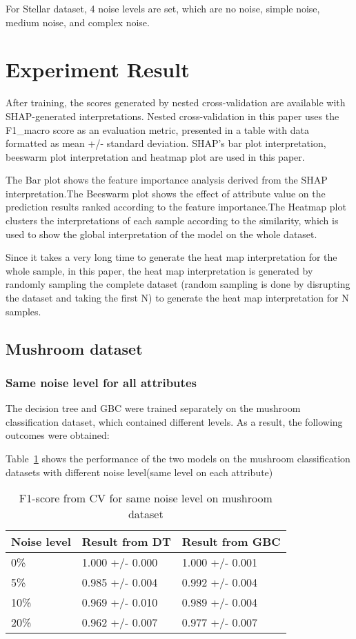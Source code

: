 \documentclass[runningheads,a4paper]{llncs}
\begin{document}
For Stellar dataset, 4 noise levels are set, which are no noise, simple noise, medium noise, and complex noise.

\section{Experiment Result}
After training, the scores generated by nested cross-validation are available with SHAP-generated interpretations. Nested cross-validation in this paper uses the F1\_macro score as an evaluation metric, presented in a table with data formatted as mean +/- standard deviation. SHAP's bar plot interpretation, beeswarm plot interpretation and heatmap plot are used in this paper.

The Bar plot shows the feature importance analysis derived from the SHAP interpretation.The Beeswarm plot shows the effect of attribute value on the prediction results ranked according to the feature importance.The Heatmap plot clusters the interpretations of each sample according to the similarity, which is used to show the global interpretation of the model on the whole dataset.

Since it takes a very long time to generate the heat map interpretation for the whole sample, in this paper, the heat map interpretation is generated by randomly sampling the complete dataset (random sampling is done by disrupting the dataset and taking the first N) to generate the heat map interpretation for N samples.
\subsection{Mushroom dataset}

\subsubsection{Same noise level for all attributes}

The decision tree and GBC were trained separately on the mushroom classification dataset, which contained different levels. As a result, the following outcomes were obtained:

Table~\ref{result from same mushroom} shows the performance of the two models on the mushroom classification datasets with different noise level(same level on each attribute)

\begin{table}[H]
\centering
\caption{F1-score from CV for same noise level on mushroom dataset}
\label{result from same mushroom}
\begin{tabular}{|l|l|l|}
\hline
Noise level & Result from DT  &Result from GBC\\
\hline
0\% & 1.000 +/- 0.000 & 1.000 +/- 0.001 \\
5\% & 0.985 +/- 0.004 & 0.992 +/- 0.004 \\
10\%& 0.969 +/- 0.010 & 0.989 +/- 0.004 \\
20\%& 0.962 +/- 0.007 & 0.977 +/- 0.007 \\
\hline
\end{tabular}
\end{table}
\end{document}
